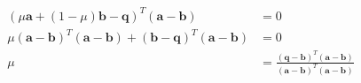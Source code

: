 \documentclass[12pt]{amsart}
\newcommand{\bq}{\mathbf{q}}
\begin{document}
\begin{align}
	(\mu \mathbf{a} + (1-\mu) \mathbf{b} - \bq) ^T( \mathbf{a}-  \mathbf{b}) &= 0 \\
	\mu( \mathbf{a} -  \mathbf{b})^T( \mathbf{a} -  \mathbf{b}) + ( \mathbf{b} - \bq)^T( \mathbf{a}-  \mathbf{b}) & = 0 \\
	\mu &= \frac{( \bq - \mathbf{b} )^T( \mathbf{a}-  \mathbf{b})}{( \mathbf{a} -  \mathbf{b})^T( \mathbf{a} -  \mathbf{b})}
\end{align}
\end{document}
